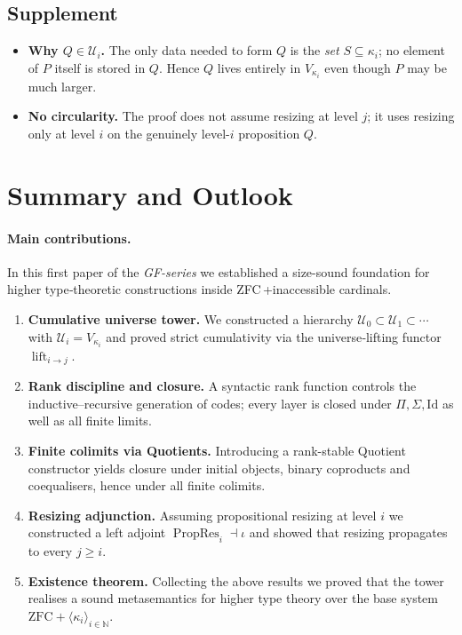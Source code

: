 \documentclass[a4paper,11pt]{article}
\newcommand{\lift}{\operatorname{lift}}      %
\begin{document}
\subsection*{Supplement}
\begin{itemize}
  \item \textbf{Why $Q\in\mathcal U_{i}$.}  
        The only data needed to form $Q$ is the \emph{set}
        $S\subseteq\kappa_{i}$; no element of $P$ itself is
        stored in $Q$.  Hence $Q$ lives entirely in
        $V_{\kappa_{i}}$ even though $P$ may be much larger.
  \item \textbf{No circularity.}  
        The proof does not assume resizing at level $j$; it uses
        resizing only at level $i$ on the genuinely level-$i$
        proposition $Q$.
\end{itemize}

\section*{Summary and Outlook}

\paragraph{Main contributions.}
In this first paper of the \emph{GF-series} we established a
size-sound foundation for higher type‐theoretic constructions
inside ZFC\,{+}inaccessible cardinals.

\begin{enumerate}[label=(\arabic*)]
  \item \textbf{Cumulative universe tower.}  
        We constructed a hierarchy
        \(\mathcal U_{0}\subset\mathcal U_{1}\subset\cdots\)
        with \(\mathcal U_{i}=V_{\kappa_{i}}\) and proved strict
        cumulativity via the universe‐lifting functor
        \(\lift_{i\to j}\).
  \item \textbf{Rank discipline and closure.}  
        A syntactic rank function controls the inductive–recursive
        generation of codes; every layer is closed under
        \(\Pi,\Sigma,\mathrm{Id}\) as well as all finite limits.
  \item \textbf{Finite colimits via Quotients.}  
        Introducing a rank-stable Quotient constructor yields closure
        under initial objects, binary coproducts and coequalisers,
        hence under all finite colimits.
  \item \textbf{Resizing adjunction.}  
        Assuming propositional resizing at level \(i\) we constructed
        a left adjoint
        \(\operatorname{PropRes}_{i}\dashv\iota\)
        and showed that resizing propagates to every
        \(j\ge i\).
  \item \textbf{Existence theorem.}  
        Collecting the above results we proved that the tower
        realises a sound metasemantics for higher type theory over
        the base system
        \(\text{ZFC}+\langle\kappa_{i}\rangle_{i\in\mathbb N}\).
\end{enumerate}
\end{document}
